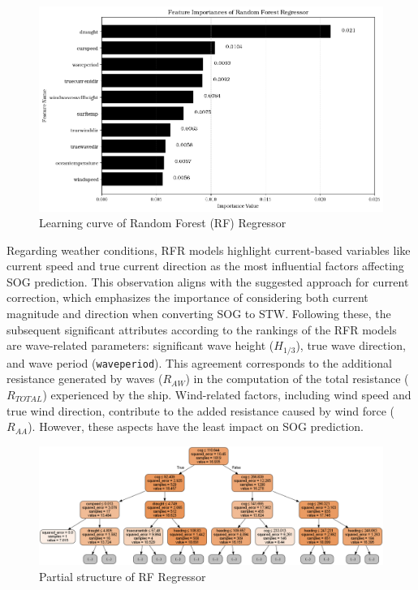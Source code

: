 \documentclass[]{interact}
\theoremstyle{plain}%
\theoremstyle{definition}
\theoremstyle{remark}
\begin{document}
\begin{figure}
  \centering
  \includegraphics[width=.8\linewidth]{00_figures/rfr_ftr_importance_nodir.png}
  \caption{Learning curve of Random Forest (RF) Regressor}
  \label{fig:learn_curve_RFR_MAE}
\end{figure}

Regarding weather conditions, RFR models highlight current-based variables like current speed and true current direction as the most influential factors affecting SOG prediction. This observation aligns with the suggested approach for current correction, which emphasizes the importance of considering both current magnitude and direction when converting SOG to STW. Following these, the subsequent significant attributes according to the rankings of the RFR models are wave-related parameters: significant wave height ($H_{1/3}$), true wave direction, and wave period ({\tt waveperiod}). This agreement corresponds to the additional resistance generated by waves ($R_{AW}$) in the computation of the total resistance ($R_{TOTAL}$) experienced by the ship. Wind-related factors, including wind speed and true wind direction, contribute to the added resistance caused by wind force ($R_{AA}$). However, these aspects have the least impact on SOG prediction.

\begin{figure}
  \label{fig:dtr_tree_trained}
  \centering
  \includegraphics[width=.9\textwidth]{00_figures/rfr_mod_it1.png}
  \caption{Partial structure of RF Regressor}
\end{figure}
\end{document}

